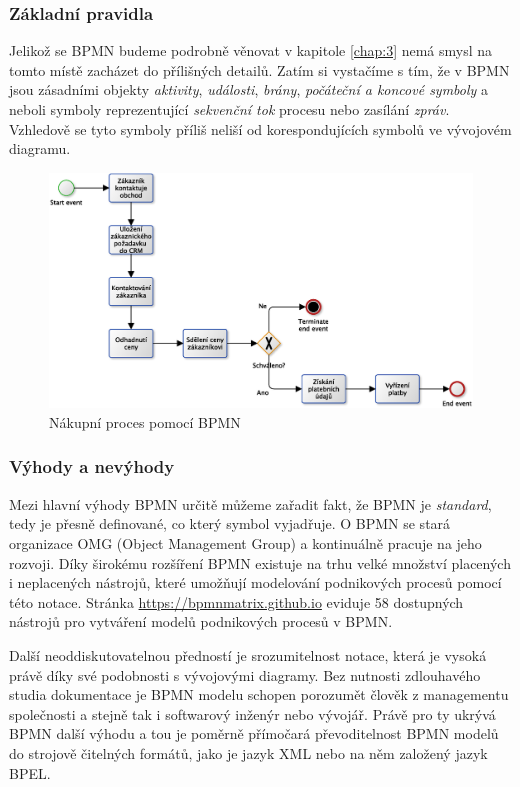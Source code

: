 \subsubsection{Základní pravidla}
Jelikož se BPMN budeme podrobně věnovat v kapitole \ref{chap:3} nemá smysl na tomto místě zacházet do přílišných detailů. Zatím si vystačíme s tím, že v BPMN jsou zásadními objekty \textit{aktivity}, \textit{události}, \textit{brány}, \textit{počáteční a koncové symboly} a \textit{} neboli symboly reprezentující \textit{sekvenční tok} procesu nebo zasílání \textit{zpráv}. Vzhledově se tyto symboly příliš neliší od korespondujících  symbolů ve vývojovém diagramu.

\begin{figure}[H]\centering 
\includegraphics[width=1.0\textwidth]{obrazky/bpmn-order-process}
\caption{Nákupní proces pomocí BPMN}
\label{fig:BPMN_nakupniproces}
\end{figure}

\subsubsection{Výhody a nevýhody}
Mezi hlavní výhody BPMN určitě můžeme zařadit fakt, že BPMN je \textit{standard}, tedy je přesně definované, co který symbol vyjadřuje. O BPMN se stará organizace OMG (Object Management Group) a kontinuálně pracuje na jeho rozvoji. Díky širokému rozšíření BPMN existuje na trhu velké množství placených i neplacených nástrojů, které umožňují modelování podnikových procesů pomocí této notace. Stránka \url{https://bpmnmatrix.github.io} eviduje 58 dostupných nástrojů pro vytváření modelů podnikových procesů v BPMN.

Další neoddiskutovatelnou předností je srozumitelnost notace, která je vysoká právě díky své podobnosti s vývojovými diagramy. Bez nutnosti zdlouhavého studia dokumentace je BPMN modelu schopen porozumět člověk z managementu společnosti a stejně tak i softwarový inženýr nebo vývojář. Právě pro ty ukrývá BPMN další výhodu a tou je poměrně přímočará převoditelnost BPMN modelů do strojově čitelných formátů, jako je jazyk XML nebo na něm založený jazyk BPEL.

